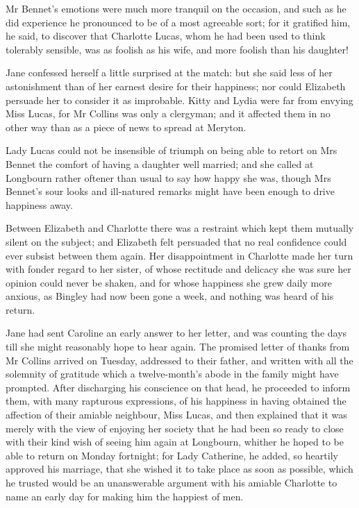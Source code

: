 Mr Bennet's emotions were much more tranquil on the occasion, and such as he did experience he pronounced to be of a most agreeable sort; for it gratified him, he said, to discover that Charlotte Lucas, whom he had been used to think tolerably sensible, was as foolish as his wife, and more foolish than his daughter!

Jane confessed herself a little surprised at the match: but she said less of her astonishment than of her earnest desire for their happiness; nor could Elizabeth persuade her to consider it as improbable. Kitty and Lydia were far from envying Miss Lucas, for Mr Collins was only a clergyman; and it affected them in no other way than as a piece of news to spread at Meryton.

Lady Lucas could not be insensible of triumph on being able to retort on Mrs Bennet the comfort of having a daughter well married; and she called at Longbourn rather oftener than usual to say how happy she was, though Mrs Bennet's sour looks and ill-natured remarks might have been enough to drive happiness away.

Between Elizabeth and Charlotte there was a restraint which kept them mutually silent on the subject; and Elizabeth felt persuaded that no real confidence could ever subsist between them again. Her disappointment in Charlotte made her turn with fonder regard to her sister, of whose rectitude and delicacy she was sure her opinion could never be shaken, and for whose happiness she grew daily more anxious, as Bingley had now been gone a week, and nothing was heard of his return.

Jane had sent Caroline an early answer to her letter, and was counting the days till she might reasonably hope to hear again. The promised letter of thanks from Mr Collins arrived on Tuesday, addressed to their father, and written with all the solemnity of gratitude which a twelve-month's abode in the family might have prompted. After discharging his conscience on that head, he proceeded to inform them, with many rapturous expressions, of his happiness in having obtained the affection of their amiable neighbour, Miss Lucas, and then explained that it was merely with the view of enjoying her society that he had been so ready to close with their kind wish of seeing him again at Longbourn, whither he hoped to be able to return on Monday fortnight; for Lady Catherine, he added, so heartily approved his marriage, that she wished it to take place as soon as possible, which he trusted would be an unanswerable argument with his amiable Charlotte to name an early day for making him the happiest of men.


